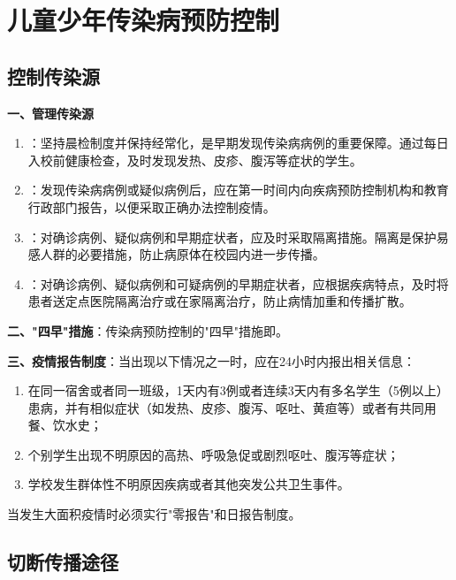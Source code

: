 \section{儿童少年传染病预防控制}

\subsection{控制传染源}

\begin{keybox}
\textbf{一、管理传染源}
\begin{enumerate}[leftmargin=*]
    \item {}：坚持晨检制度并保持经常化，是早期发现传染病病例的重要保障。通过每日入校前健康检查，及时发现发热、皮疹、腹泻等症状的学生。
    \item {}：发现传染病病例或疑似病例后，应在第一时间内向疾病预防控制机构和教育行政部门报告，以便采取正确办法控制疫情。
    \item {}：对确诊病例、疑似病例和早期症状者，应及时采取隔离措施。隔离是保护易感人群的必要措施，防止病原体在校园内进一步传播。
    \item {}：对确诊病例、疑似病例和可疑病例的早期症状者，应根据疾病特点，及时将患者送定点医院隔离治疗或在家隔离治疗，防止病情加重和传播扩散。
\end{enumerate}

\textbf{二、"四早"措施}：传染病预防控制的"四早"措施即。

\textbf{三、疫情报告制度}：当出现以下情况之一时，应在24小时内报出相关信息：
\begin{enumerate}[leftmargin=*]
    \item 在同一宿舍或者同一班级，1天内有3例或者连续3天内有多名学生（5例以上）患病，并有相似症状（如发热、皮疹、腹泻、呕吐、黄疸等）或者有共同用餐、饮水史；
    \item 个别学生出现不明原因的高热、呼吸急促或剧烈呕吐、腹泻等症状；
    \item 学校发生群体性不明原因疾病或者其他突发公共卫生事件。
\end{enumerate}
当发生大面积疫情时必须实行"零报告"和日报告制度。
\end{keybox}

\subsection{切断传播途径}

